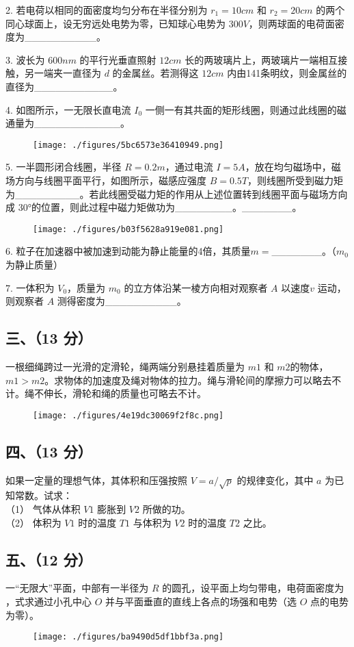 2. 若电荷以相同的面密度均匀分布在半径分别为 $r_1=10cm$ 和 $r_2=20cm$ 的两个同心球面上，设无穷远处电势为零，已知球心电势为 $300V$，则两球面的电荷面密度为__________。

3. 波长为 $600nm$ 的平行光垂直照射 $12cm$ 长的两玻璃片上，两玻璃片一端相互接触，另一端夹一直径为 $d$ 的金属丝。若测得这 $12cm$ 内由141条明纹，则金属丝的直径为___________。

4. 如图所示，一无限长直电流 $I_0$ 一侧一有其共面的矩形线圈，则通过此线圈的磁通量为____________。
\begin{figure}[ht]
\centering
\texttt{[image: ./figures/5bc6573e36410949.png]}
\caption{} \label{fig_NJUD2_4}
\end{figure}
5. 一半圆形闭合线圈，半径 $R=0.2m$，通过电流 $I=5A$，放在均匀磁场中，磁场方向与线圈平面平行，如图所示，磁感应强度 $B=0.5T$，则线圈所受到磁力矩为_________。若此线圈受磁力矩的作用从上述位置转到线圈平面与磁场方向成 30°的位置，则此过程中磁力矩做功为________。_______。
\begin{figure}[ht]
\centering
\texttt{[image: ./figures/b03f5628a919e081.png]}
\caption{} \label{fig_NJUD2_5}
\end{figure}
6. 粒子在加速器中被加速到动能为静止能量的4倍，其质量$m=$_______。（$m_0$ 为静止质量）

7. 一体积为 $V_0$，质量为 $m_0$ 的立方体沿某一棱方向相对观察者 $A$ 以速度$v$ 运动，则观察者 $A$ 测得密度为__________。
\subsection{三、（13 分）}
一根细绳跨过一光滑的定滑轮，绳两端分别悬挂着质量为 $m1$ 和 $m2$的物体，$m1>m2$。求物体的加速度及绳对物体的拉力。绳与滑轮间的摩擦力可以略去不计。绳不伸长，滑轮和绳的质量也可略去不计。
\begin{figure}[ht]
\centering
\texttt{[image: ./figures/4e19dc30069f2f8c.png]}
\caption{} \label{fig_NJUD2_6}
\end{figure}
\subsection{四、（13 分）}
如果一定量的理想气体，其体积和压强按照 $V=a/\sqrt{p}$ 的规律变化，其中 $a$ 为已知常数。试求：\\
（1） 气体从体积 $V1$ 膨胀到 $V2$ 所做的功。\\
（2） 体积为 $V1$ 时的温度 $T1$ 与体积为 $V2$ 时的温度 $T2$ 之比。
\subsection{五、（12 分）}
一“无限大”平面，中部有一半径为 $R$ 的圆孔，设平面上均匀带电，电荷面密度为 ，式求通过小孔中心 $O$ 并与平面垂直的直线上各点的场强和电势（选 $O$ 点的电势为零）。
\begin{figure}[ht]
\centering
\texttt{[image: ./figures/ba9490d5df1bbf3a.png]}
\caption{} \label{fig_NJUD2_7}
\end{figure}
